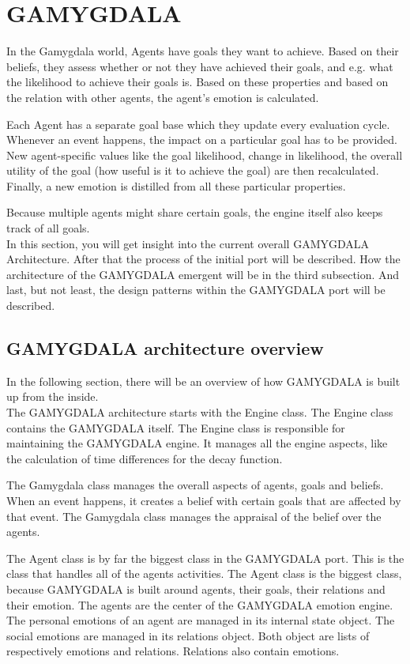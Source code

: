\section{GAMYGDALA}
In the Gamygdala world, Agents have goals they want to achieve. Based on their beliefs, they assess whether or not they have achieved their goals, and e.g. what the likelihood to achieve their goals is. Based on these properties and based on the relation with other agents, the agent's emotion is calculated.

Each Agent has a separate goal base which they update every evaluation cycle. Whenever an event happens, the impact on a particular goal has to be provided. New agent-specific values like the goal likelihood, change in likelihood, the overall utility of the goal (how useful is it to achieve the goal) are then recalculated. Finally, a new emotion is distilled from all these particular properties.

Because multiple agents might share certain goals, the engine itself also keeps track of all goals. \\

In this section, you will get insight into the current overall GAMYGDALA Architecture. After that the process of the initial port will be described. How the architecture of the GAMYGDALA emergent will be in the third subsection. And last, but not least, the design patterns within the GAMYGDALA port will be described. 

\subsection{GAMYGDALA architecture overview}
In the following section, there will be an overview of how GAMYGDALA is built up from the inside. \\

The GAMYGDALA architecture starts with the Engine class. The Engine class contains the GAMYGDALA itself. The Engine class is responsible for maintaining the GAMYGDALA engine. It manages all the engine aspects, like the calculation of time differences for the decay function.

The Gamygdala class manages the overall aspects of agents, goals and beliefs. When an event happens, it creates a belief with certain goals that are affected by that event. The Gamygdala class manages the appraisal of the belief over the agents.

The Agent class is by far the biggest class in the GAMYGDALA port. This is the class that handles all of the agents activities. The Agent class is the biggest class, because GAMYGDALA is built around agents, their goals, their relations and their emotion. The agents are the center of the GAMYGDALA emotion engine. The personal emotions of an agent are managed in its internal state object. The social emotions are managed in its relations object. Both object are lists of respectively emotions and relations. Relations also contain emotions.

